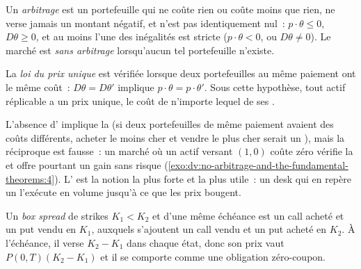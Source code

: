 \begin{definition}[Arbitrage]\label{def:dv:no-arbitrage-and-the-fundamental-theorems:arbitrage}
Un \emph{arbitrage} est un portefeuille qui ne coûte rien ou
coûte moins que rien, ne verse jamais un montant négatif, et n'est pas identiquement nul~: $p\cdot
\theta\le0$, $D\theta\ge0$, et au moins l'une des inégalités est stricte ($p\cdot
\theta<0$, ou $D\theta\ne0$). Le marché est \emph{sans arbitrage} lorsqu'aucun tel
portefeuille n'existe.
\end{definition}

\begin{definition}\label{def:dv:no-arbitrage-and-the-fundamental-theorems:loop}
La \emph{loi du prix unique} est vérifiée lorsque deux portefeuilles
au même paiement ont le même coût~: $D\theta=D\theta'$ implique $p\cdot
\theta=p\cdot\theta'$. Sous cette hypothèse, tout actif réplicable a un prix unique,
le coût de n'importe lequel de ses .
\end{definition}

L'absence d' implique la  (si deux portefeuilles de même paiement
avaient des coûts différents, acheter le moins cher et vendre le plus cher serait un ),
mais la réciproque est fausse~: un marché où un actif versant $(1,0)$
coûte zéro vérifie la  et offre pourtant un gain sans risque
(\cref{exo:dv:no-arbitrage-and-the-fundamental-theorems:4}). L'
est la notion la plus forte et la plus utile~: un desk qui en repère un l'exécute
en volume jusqu'à ce que les prix bougent.

\begin{definition}\label{def:dv:no-arbitrage-and-the-fundamental-theorems:box}
Un \emph{box spread} de strikes $K_1<K_2$ et d'une même échéance est
un call acheté et un put vendu en $K_1$, auxquels s'ajoutent un call vendu et un put acheté en $K_2$.
À l'échéance, il verse $K_2-K_1$ dans chaque état, donc son prix vaut
$P(0,T)(K_2-K_1)$ et il se comporte comme une obligation zéro-coupon.
\end{definition}

